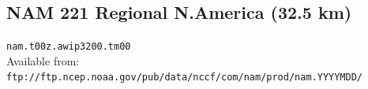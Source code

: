 \documentclass[11pt]{article}   %
\begin{document}
%
%


\clearpage
\subsection{NAM 221 Regional N.America (32.5 km)}

\verb|nam.t00z.awip3200.tm00|\\
Available from:\\
\verb|ftp://ftp.ncep.noaa.gov/pub/data/nccf/com/nam/prod/nam.YYYYMDD/| \\
\end{document}
